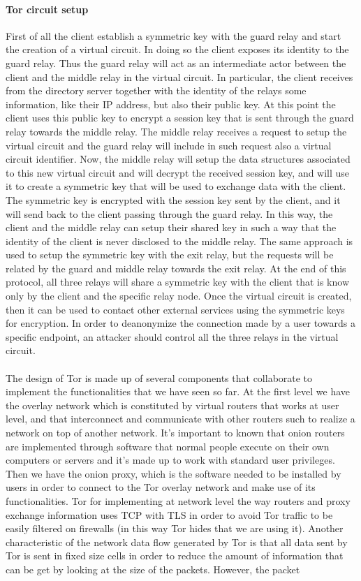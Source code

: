 \paragraph{Tor circuit setup} First of all the client establish a symmetric key with the guard relay and start the creation of a virtual circuit. In doing so the client exposes its identity to the guard relay. Thus the guard relay will act as an intermediate actor between the client and the middle relay in the virtual circuit. In particular, the client receives from the directory server together with the identity of the relays some information, like their IP address, but also their public key. At this point the client uses this public key to encrypt a session key that is sent through the guard relay towards the middle relay. The middle relay receives a request to setup the virtual circuit and the guard relay will include in such request also a virtual circuit identifier. Now, the middle relay will setup the data structures associated to this new virtual circuit and will decrypt the received session key, and will use it to create a symmetric key that will be used to exchange data with the client. The symmetric key is encrypted with the session key sent by the client, and it will send back to the client passing through the guard relay. In this way, the client and the middle relay can setup their shared key in such a way that the identity of the client is never disclosed to the middle relay. The same approach is used to setup the symmetric key with the exit relay, but the requests will be related by the guard and middle relay towards the exit relay. At the end of this protocol, all three relays will share a symmetric key with the client that is know only  by the client and the specific relay node. Once the virtual circuit is created, then it can be used to contact other external services using the symmetric keys for encryption. In order to deanonymize the connection made by a user towards a specific endpoint, an attacker should control all the three relays in the virtual circuit.\\\\The design of Tor is made up of several components that collaborate to implement the functionalities that we have seen so far. At the first level we have the overlay network which is constituted by virtual routers that works at user level, and that interconnect and communicate with other routers such to realize a network on top of another network. It's important to known that onion routers are implemented through software that normal people execute on their own computers or servers and it's made up to work with standard user privileges. Then we have the onion proxy, which is the software needed to be installed by users in order to connect to the Tor overlay network and make use of its functionalities. Tor for implementing at network level the way routers and proxy exchange information uses TCP with TLS in order to avoid Tor traffic to be easily filtered on firewalls (in this way Tor hides that we are using it). Another characteristic of the network data flow generated by Tor is that all data sent by Tor is sent in fixed size cells in order to reduce the amount of information that can be get by looking at the size of the packets. However, the packet 